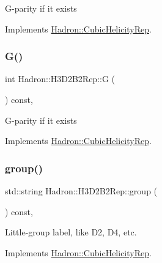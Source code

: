 G-\/parity if it exists 

Implements \mbox{\hyperlink{structHadron_1_1CubicHelicityRep_a50689f42be1e6170aa8cf6ad0597018b}{Hadron\+::\+Cubic\+Helicity\+Rep}}.

\mbox{\label{structHadron_1_1H3D2B2Rep_a99a41bf1ea4b0ac1918c75c46479fb5e}} 
\subsubsection{\texorpdfstring{G()}{G()}\hspace{0.1cm}{\footnotesize\ttfamily [2/2]}}
{\footnotesize\ttfamily int Hadron\+::\+H3\+D2\+B2\+Rep\+::G (\begin{DoxyParamCaption}{ }\end{DoxyParamCaption}) const\hspace{0.3cm}{\ttfamily [inline]}, {\ttfamily [virtual]}}

G-\/parity if it exists 

Implements \mbox{\hyperlink{structHadron_1_1CubicHelicityRep_a50689f42be1e6170aa8cf6ad0597018b}{Hadron\+::\+Cubic\+Helicity\+Rep}}.

\mbox{\label{structHadron_1_1H3D2B2Rep_a54d96e4bedb375325552d1f5e8149f30}} 
\subsubsection{\texorpdfstring{group()}{group()}\hspace{0.1cm}{\footnotesize\ttfamily [1/3]}}
{\footnotesize\ttfamily std\+::string Hadron\+::\+H3\+D2\+B2\+Rep\+::group (\begin{DoxyParamCaption}{ }\end{DoxyParamCaption}) const\hspace{0.3cm}{\ttfamily [inline]}, {\ttfamily [virtual]}}

Little-\/group label, like D2, D4, etc. 

Implements \mbox{\hyperlink{structHadron_1_1CubicHelicityRep_a101a7d76cd8ccdad0f272db44b766113}{Hadron\+::\+Cubic\+Helicity\+Rep}}.

\mbox{\label{structHadron_1_1H3D2B2Rep_a54d96e4bedb375325552d1f5e8149f30}} 
